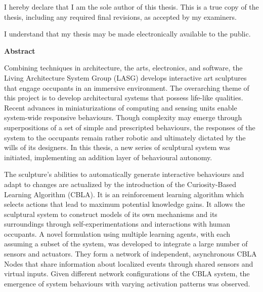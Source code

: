 \cleardoublepage %
 


  \noindent
I hereby declare that I am the sole author of this thesis. This is a true copy of the thesis, including any required final revisions, as accepted by my examiners.

  \bigskip
  
  \noindent
I understand that my thesis may be made electronically available to the public.

\cleardoublepage


\begin{center}\textbf{Abstract}\end{center}

Combining techniques in architecture, the arts, electronics, and software, the Living Architecture System Group (LASG) develops interactive art sculptures that engage occupants in an immersive environment. The overarching theme of this project is to develop architectural systems that possess life-like qualities. Recent advances in miniaturizations of computing and sensing units enable system-wide responsive behaviours. Though complexity may emerge through superpositions of a set of simple and prescripted behaviours, the responses of the system to the occupants remain rather robotic and ultimately dictated by the wills of its designers. In this thesis, a new series of sculptural system was initiated, implementing an addition layer of behavioural autonomy. 

The sculpture's abilities to automatically generate interactive behaviours and adapt to changes are actualized by the introduction of the Curiosity-Based Learning Algorithm (CBLA). It is an reinforcement learning algorithm which selects actions that lead to maximum potential knowledge gains. It allows the sculptural system to construct models of its own mechanisms and its surroundings through self-experimentations and interactions with human occupants. A novel formulation using multiple learning agents, with each assuming a subset of the system, was developed to integrate a large number of sensors and actuators. They form a network of independent, asynchronous CBLA Nodes that share information about localized events through shared sensors and virtual inputs. Given different network configurations of the CBLA system, the emergence of system behaviours with varying activation patterns was observed. 

